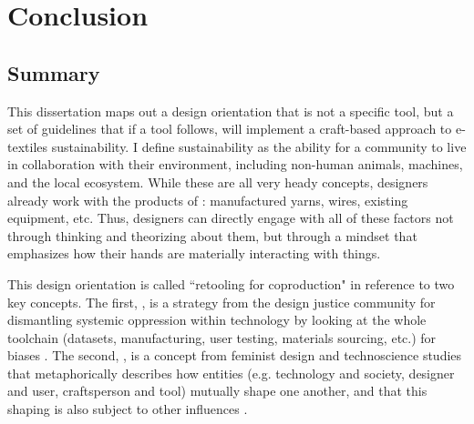 \chapter{Conclusion}



\section{Summary}

This dissertation maps out a design orientation that is not a specific tool, but a set of guidelines that if a tool follows, will implement a craft-based approach to e-textiles sustainability. 
I define sustainability as the ability for a community to live in collaboration with their environment, including non-human animals, machines, and the local ecosystem. While these are all very heady concepts, designers already work with the products of : manufactured yarns, wires, existing equipment, etc. Thus, designers can directly engage with all of these factors not through thinking and theorizing about them, but through a  mindset that emphasizes how their hands are materially interacting with things.

This design orientation is called ``retooling for coproduction" in reference to two key concepts. The first, , is a strategy from the design justice community for dismantling systemic oppression within technology by looking at the whole toolchain (datasets, manufacturing, user testing, materials sourcing, etc.) for biases \cite{costanza-chock_design_2020}. The second, , is a concept from feminist design and technoscience studies that metaphorically describes how entities (e.g. technology and society, designer and user, craftsperson and tool) mutually shape one another, and that this shaping is also subject to other influences \cite{jasanoff_states_2010,haraway_staying_2016}. 

